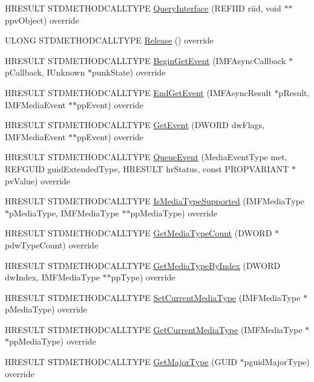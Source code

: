 \begin{DoxyCompactItemize}
\item 
H\+R\+E\+S\+U\+LT S\+T\+D\+M\+E\+T\+H\+O\+D\+C\+A\+L\+L\+T\+Y\+PE \hyperlink{class_video_stream_sink_aab479e5acecb695b0fdc04116ea4b985}{Query\+Interface} (R\+E\+F\+I\+ID riid, void $\ast$$\ast$ppv\+Object) override
\item 
U\+L\+O\+NG S\+T\+D\+M\+E\+T\+H\+O\+D\+C\+A\+L\+L\+T\+Y\+PE \hyperlink{class_video_stream_sink_a67891df0d73723ad9855133edb1eda2a}{Release} () override
\item 
H\+R\+E\+S\+U\+LT S\+T\+D\+M\+E\+T\+H\+O\+D\+C\+A\+L\+L\+T\+Y\+PE \hyperlink{class_video_stream_sink_a857b22289c87200bc4c5cced5f11b4df}{Begin\+Get\+Event} (I\+M\+F\+Async\+Callback $\ast$p\+Callback, I\+Unknown $\ast$punk\+State) override
\item 
H\+R\+E\+S\+U\+LT S\+T\+D\+M\+E\+T\+H\+O\+D\+C\+A\+L\+L\+T\+Y\+PE \hyperlink{class_video_stream_sink_afac5a503d03560675dfb678d389278d7}{End\+Get\+Event} (I\+M\+F\+Async\+Result $\ast$p\+Result, I\+M\+F\+Media\+Event $\ast$$\ast$pp\+Event) override
\item 
H\+R\+E\+S\+U\+LT S\+T\+D\+M\+E\+T\+H\+O\+D\+C\+A\+L\+L\+T\+Y\+PE \hyperlink{class_video_stream_sink_ac13a796e21183937909dad2ff42b3bda}{Get\+Event} (D\+W\+O\+RD dw\+Flags, I\+M\+F\+Media\+Event $\ast$$\ast$pp\+Event) override
\item 
H\+R\+E\+S\+U\+LT S\+T\+D\+M\+E\+T\+H\+O\+D\+C\+A\+L\+L\+T\+Y\+PE \hyperlink{class_video_stream_sink_a272af1cbaa67351da651a86d1fedbf64}{Queue\+Event} (Media\+Event\+Type met, R\+E\+F\+G\+U\+ID guid\+Extended\+Type, H\+R\+E\+S\+U\+LT hr\+Status, const P\+R\+O\+P\+V\+A\+R\+I\+A\+NT $\ast$pv\+Value) override
\item 
H\+R\+E\+S\+U\+LT S\+T\+D\+M\+E\+T\+H\+O\+D\+C\+A\+L\+L\+T\+Y\+PE \hyperlink{class_video_stream_sink_afd1131bacb02ec5ef1f3d4120eb278dd}{Is\+Media\+Type\+Supported} (I\+M\+F\+Media\+Type $\ast$p\+Media\+Type, I\+M\+F\+Media\+Type $\ast$$\ast$pp\+Media\+Type) override
\item 
H\+R\+E\+S\+U\+LT S\+T\+D\+M\+E\+T\+H\+O\+D\+C\+A\+L\+L\+T\+Y\+PE \hyperlink{class_video_stream_sink_a65dc9a2cbcf7a61545814d77e545c695}{Get\+Media\+Type\+Count} (D\+W\+O\+RD $\ast$pdw\+Type\+Count) override
\item 
H\+R\+E\+S\+U\+LT S\+T\+D\+M\+E\+T\+H\+O\+D\+C\+A\+L\+L\+T\+Y\+PE \hyperlink{class_video_stream_sink_ad16f2aef8d1aa81abb3809fa6beb0aac}{Get\+Media\+Type\+By\+Index} (D\+W\+O\+RD dw\+Index, I\+M\+F\+Media\+Type $\ast$$\ast$pp\+Type) override
\item 
H\+R\+E\+S\+U\+LT S\+T\+D\+M\+E\+T\+H\+O\+D\+C\+A\+L\+L\+T\+Y\+PE \hyperlink{class_video_stream_sink_a708ab1908bc90889ba19fddb91ad4718}{Set\+Current\+Media\+Type} (I\+M\+F\+Media\+Type $\ast$p\+Media\+Type) override
\item 
H\+R\+E\+S\+U\+LT S\+T\+D\+M\+E\+T\+H\+O\+D\+C\+A\+L\+L\+T\+Y\+PE \hyperlink{class_video_stream_sink_ad8d51de3473d2f406575d6abac954917}{Get\+Current\+Media\+Type} (I\+M\+F\+Media\+Type $\ast$$\ast$pp\+Media\+Type) override
\item 
H\+R\+E\+S\+U\+LT S\+T\+D\+M\+E\+T\+H\+O\+D\+C\+A\+L\+L\+T\+Y\+PE \hyperlink{class_video_stream_sink_abc73a5e84cf2d3588866682f22a19285}{Get\+Major\+Type} (G\+U\+ID $\ast$pguid\+Major\+Type) override
\end{DoxyCompactItemize}
